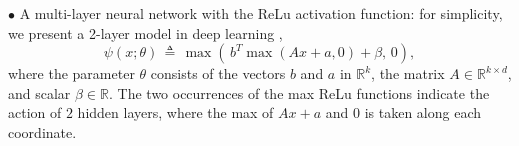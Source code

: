 \documentclass{siamart}
\newcommand{\thalf}{{\textstyle \frac{1}{2}}}
\begin{document}
$\bullet $ A multi-layer neural network with the ReLu activation function: for simplicity, we present a 2-layer model in deep learning \cite{YuDeng15},
\begin{equation}\label{defn: 2-layer ReLu}
\psi(x;\theta) \, \triangleq \, \max\left( \, b^T \max\left( Ax + a, 0 \right) + \beta, \, 0 \right),
\end{equation}
where the parameter $\theta$ consists of the vectors $b$ and $a$ in $\mathbb{R}^k$, the matrix $A \in \mathbb{R}^{k \times d}$,
and scalar $\beta \in \mathbb{R}$.  The two occurrences of the max ReLu functions indicate the action of $2$ hidden layers,
where the max of $Ax + a$ and $0$ is taken along each coordinate.
\end{document}
